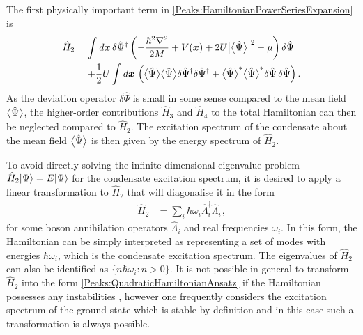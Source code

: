 The first physically important term in \eqref{Peaks:HamiltonianPowerSeriesExpansion} is
\begin{align}
    \begin{split}
        \hat{H}_2 &= \int d \bm{x}\, \delta \hat{\Psi}^\dagger \left(-\frac{\hbar^2 \nabla^2}{2 M} + V(\bm{x}) + 2 U\big|\mean{\hat{\Psi}}\big|^2 -\mu \right)\delta\hat{\Psi}\\
         &\relphantom{=} + \frac{1}{2} U\int d \bm{x}\, \left(\mean{\hat{\Psi}}\mean{\hat{\Psi}} \delta \hat{\Psi}^\dagger\delta \hat{\Psi}^\dagger  +  \mean{\hat{\Psi}}^*\mean{\hat{\Psi}}^* \delta \hat{\Psi} \,\delta \hat{\Psi}\right).
    \end{split}
    \label{Peaks:HamiltonianPowerSeriesQuadraticTerm}
\end{align}
As the deviation operator $\delta \hat{\Psi}$ is small in some sense compared to the mean field ${\big<\hat{\Psi}\big>}$, the higher-order contributions $\hat{H}_3$ and $\hat{H}_4$ to the total Hamiltonian can then be neglected compared to $\hat{H}_2$. The excitation spectrum of the condensate about the mean field ${\big<\hat{\Psi}\big>}$ is then given by the energy spectrum of $\hat{H}_2$.

To avoid directly solving the infinite dimensional eigenvalue problem $\hat{H}_2 {\left|\Psi\right>} = E {\left|\Psi\right>}$ for the condensate excitation spectrum, it is desired to apply a linear transformation to $\hat{H}_2$ that will diagonalise it in the form
\begin{align}
    \label{Peaks:QuadraticHamiltonianAnsatz}
    \hat{H}_2 &= \sum_i \hbar \omega_i \hat{\Lambda}_i^\dagger \hat{\Lambda}_i^{\phantom{\dagger}},
\end{align}
for some boson annihilation operators $\hat{\Lambda}_i$ and real frequencies $\omega_i$. In this form, the Hamiltonian can be simply interpreted as representing a set of modes with energies $\hbar \omega_i$, which is the condensate excitation spectrum. The eigenvalues of $\hat{H}_2$ can also be identified as $\{n \hbar \omega_i : n > 0 \}$. It is not possible in general to transform $\hat{H}_2$ into the form \eqref{Peaks:QuadraticHamiltonianAnsatz} if the Hamiltonian possesses any instabilities \citep{Leonhardt:2003}, however one frequently considers the excitation spectrum of the ground state which is stable by definition and in this case such a transformation is always possible.

